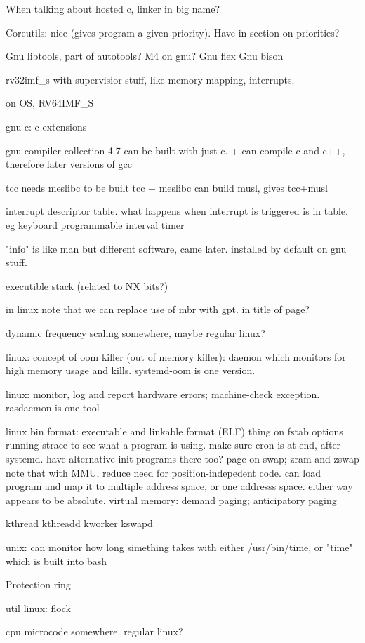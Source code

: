 When talking about hosted c, linker in big name?

Coreutils: nice (gives program a given priority). Have in section on priorities?

Gnu libtools, part of autotools?
M4 on gnu?
Gnu flex
Gnu bison

rv32imf\_s
with supervisior stuff, like memory mapping, interrupts.

on OS, RV64IMF\_S

gnu c: c extensions

gnu compiler collection 4.7 can be built with just c.
+ can compile c and c++, therefore later versions of gcc

tcc needs meslibc to be built
tcc + meslibc can build musl, gives tcc+musl

interrupt descriptor table.
what happens when interrupt is triggered is in table.
eg keyboard
programmable interval timer

"info" is like man but different software, came later. installed by default on gnu stuff.

executible stack (related to NX bits?)



in linux note that we can replace use of mbr with gpt. in title of page?

dynamic frequency scaling somewhere, maybe regular linux?

linux: concept of oom killer (out of memory killer): daemon which monitors for high memory usage and kills. systemd-oom is one version.

linux: monitor, log and report hardware errors; machine-check exception. rasdaemon is one tool

linux bin format: executable and linkable format (ELF)
thing on fstab options
running strace to see what a program is using.
make sure cron is at end, after systemd. have alternative init programs there too?
page on swap; zram and zswap
note that with MMU, reduce need for position-indepedent code. can load program and map it to multiple address space, or one addresss space. either way appears to be absolute.
virtual memory: demand paging; anticipatory paging

kthread
kthreadd
kworker
kswapd


unix: can monitor how long simething takes with either /usr/bin/time, or "time" which is built into bash

Protection ring

util linux: flock


cpu microcode somewhere. regular linux?

